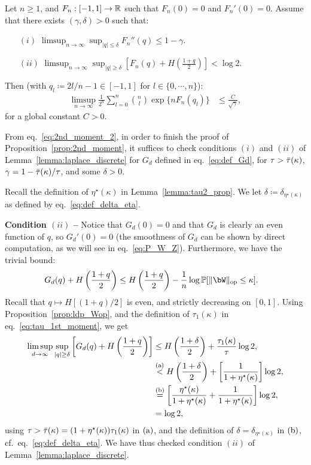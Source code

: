 \begin{lemma}\label{lemma:laplace_discrete}
    Let $n \geq 1$, and $F_n : [-1,1] \to \mathbb{R}$ such that $F_n(0) = 0$ and $F_n'(0) = 0$.
    Assume that there exists $(\gamma, \delta) > 0$ such that:
    \begin{itemize}
        \item[$(i)$] $\limsup_{n \to \infty} \sup_{|q| \leq \delta} F_n''(q) \leq 1 - \gamma$. 
        \item[$(ii)$] $\limsup_{n \to \infty} \sup_{|q| \geq \delta} \left[F_n(q) + H\left(\frac{1+q}{2}\right) \right] < \log 2$. 
    \end{itemize}
    Then (with $q_l \coloneqq 2l/n - 1 \in [-1,1]$ for $l \in \{0,\cdots, n\}$):
    \begin{align*}
        \limsup_{n \to \infty} \frac{1}{2^n}\sum_{l=0}^n \binom{n}{l} \exp\{n F_n(q_l)\} &\leq \frac{C}{\sqrt{\gamma}},
    \end{align*}
    for a global constant $C > 0$.
\end{lemma}
\noindent
From eq.~\eqref{eq:2nd_moment_2}, in order to finish the proof of Proposition~\ref{prop:2nd_moment}, it suffices to check conditions 
$(i)$ and $(ii)$ of Lemma~\ref{lemma:laplace_discrete} for $G_d$ defined in eq.~\eqref{eq:def_Gd}, for $\tau > {\bar{\tau}}(\kappa)$, $\gamma = 1 - {\bar{\tau}}(\kappa)/\tau$, and some $\delta > 0$.

\myskip
Recall the definition of $\eta^\star(\kappa)$ in Lemma~\ref{lemma:tau2_prop}. 
We let $\delta \coloneqq \delta_{\eta^\star(\kappa)}$ as defined by eq.~\eqref{eq:def_delta_eta}.

\myskip 
\textbf{Condition $(ii)$ --} 
Notice that $G_d(0) = 0$ and that $G_d$ is clearly an even function of $q$, so $G_d'(0) = 0$ (the smoothness of $G_d$ can be shown by direct computation, as we will see in eq.~\eqref{eq:P_W_Z}).
Furthermore, we have the trivial bound:
\begin{align*}
    G_d(q) + H \left(\frac{1+q}{2}\right) &\leq H \left(\frac{1+q}{2}\right)  - \frac{1}{n} \log \bbP[\|\bW\|_\op \leq \kappa].
\end{align*}
Recall that $q \mapsto H[(1+q)/2]$ is even, and strictly decreasing on $[0,1]$.
Using Proposition~\ref{prop:ldp_Wop}, and the definition of $\tau_1(\kappa)$ in eq.~\eqref{eq:tau_1st_moment}, 
we get
\begin{align*}
    \limsup_{d \to \infty} \sup_{|q| \geq \delta} \left[G_d(q) + H \left(\frac{1+q}{2}\right)\right] &\leq H \left(\frac{1+\delta}{2}\right) + \frac{\tau_1(\kappa)}{\tau} \log 2, \\ 
    &\overset{\mathrm{(a)}}{<} H \left(\frac{1+\delta}{2}\right) + \left[\frac{1}{1+\eta^\star(\kappa)}\right] \log 2, \\ 
    &\overset{\mathrm{(b)}}{=} \left[\frac{\eta^\star(\kappa)}{1+\eta^\star(\kappa)} + \frac{1}{1+\eta^\star(\kappa)}\right] \log 2, \\ 
    &= \log 2,
\end{align*}
using $\tau > {\bar{\tau}}(\kappa) = (1+\eta^\star(\kappa))\tau_1(\kappa)$ in $(\rm a)$, 
and the definition of $\delta = \delta_{\eta^\star(\kappa)}$ in $(\rm b)$, cf.\ eq.~\eqref{eq:def_delta_eta}.
We have thus checked condition $(ii)$ of Lemma~\ref{lemma:laplace_discrete}.

